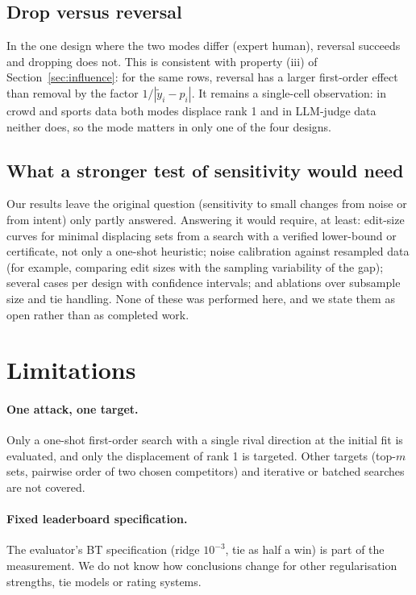 \documentclass{article}
\begin{document}
\subsection{Drop versus reversal}
In the one design where the two modes differ (expert human), reversal succeeds and dropping does not. This is consistent with property (iii) of Section~\ref{sec:influence}: for the same rows, reversal has a larger first-order effect than removal by the factor $1/|\tilde y_i-p_i|$. It remains a single-cell observation: in crowd and sports data both modes displace rank 1 and in LLM-judge data neither does, so the mode matters in only one of the four designs.

\subsection{What a stronger test of sensitivity would need}
Our results leave the original question (sensitivity to small changes from noise or from intent) only partly answered. Answering it would require, at least: edit-size curves for minimal displacing sets from a search with a verified lower-bound or certificate, not only a one-shot heuristic; noise calibration against resampled data (for example, comparing edit sizes with the sampling variability of the gap); several cases per design with confidence intervals; and ablations over subsample size and tie handling. None of these was performed here, and we state them as open rather than as completed work.

\section{Limitations}
\label{sec:limits}
\paragraph{One attack, one target.} Only a one-shot first-order search with a single rival direction at the initial fit is evaluated, and only the displacement of rank 1 is targeted. Other targets (top-$m$ sets, pairwise order of two chosen competitors) and iterative or batched searches are not covered.
\paragraph{Fixed leaderboard specification.} The evaluator's BT specification (ridge $10^{-3}$, tie as half a win) is part of the measurement. We do not know how conclusions change for other regularisation strengths, tie models or rating systems.
\end{document}
